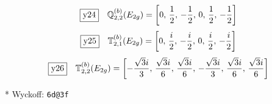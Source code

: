 \documentclass[fleqn,10pt,landscape]{jsarticle}
\begin{document}
\begin{dmath*}
\fbox{y24}\quad \mathbb{Q}_{2,2}^{(b)}(E_{2g})=\left[ 0,\, \frac{1}{2},\, - \frac{1}{2},\, 0,\, \frac{1}{2},\, - \frac{1}{2} \right]
\end{dmath*}
\begin{dmath*}
\fbox{y25}\quad \mathbb{T}_{2,1}^{(b)}(E_{2g})=\left[ 0,\, \frac{i}{2},\, - \frac{i}{2},\, 0,\, \frac{i}{2},\, - \frac{i}{2} \right]
\end{dmath*}
\begin{dmath*}
\fbox{y26}\quad \mathbb{T}_{2,2}^{(b)}(E_{2g})=\left[ - \frac{\sqrt{3} i}{3},\, \frac{\sqrt{3} i}{6},\, \frac{\sqrt{3} i}{6},\, - \frac{\sqrt{3} i}{3},\, \frac{\sqrt{3} i}{6},\, \frac{\sqrt{3} i}{6} \right]
\end{dmath*}
\vspace{5mm}

\noindent ** Wyckoff: \texttt{6d@3f}
\end{document}

